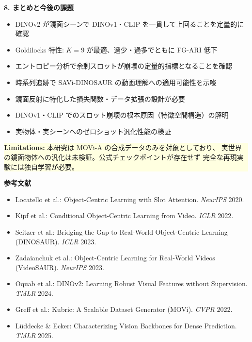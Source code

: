\documentclass[12pt]{jarticle}
\newcommand{\sechead}[1]{%
  \vspace{2mm}%
  \colorbox{secblue}{\parbox{\dimexpr\linewidth-2\fboxsep}{\color{white}\Huge\textbf{#1}}}%
  \vspace{2mm}%
}
\begin{document}
\begin{minipage}[t]{0.487\linewidth}
\sechead{8. まとめと今後の課題}
\begin{itemize}
  \item DINOv2 が鏡面シーンで DINOv1・CLIP を一貫して上回ることを定量的に確認
  \item Goldilocks 特性: $K{=}9$ が最適、過少・過多でともに FG-ARI 低下
  \item エントロピー分析で余剰スロットが崩壊の定量的指標となることを確認
  \item 時系列追跡で SAVi-DINOSAUR の動画理解への適用可能性を示唆
\end{itemize}
\vspace{2mm}
\begin{itemize}
  \item 鏡面反射に特化した損失関数・データ拡張の設計が必要
  \item DINOv1・CLIP でのスロット崩壊の根本原因（特徴空間構造）の解明
  \item 実物体・実シーンへのゼロショット汎化性能の検証
\end{itemize}
\vspace{2mm}
\colorbox{lightyellow}{\parbox{\dimexpr\linewidth-2\fboxsep}{%
  \textbf{Limitations:} 本研究は MOVi-A の合成データのみを対象としており、
  実世界の鏡面物体への汎化は未検証。公式チェックポイントが存在せず
  完全な再現実験には独自学習が必要。
}}

\end{minipage}

\vspace{4mm}
\colorbox{secblue}{\parbox{\linewidth}{\color{white}\Huge\textbf{参考文献}}}\vspace{2mm}
\fontsize{18}{24}\selectfont
\begin{minipage}[t]{0.487\linewidth}
\begin{itemize}[leftmargin=1.5em, itemsep=1pt, topsep=0pt]
  \item Locatello et al.: Object-Centric Learning with Slot Attention. \textit{NeurIPS} 2020.
  \item Kipf et al.: Conditional Object-Centric Learning from Video. \textit{ICLR} 2022.
  \item Seitzer et al.: Bridging the Gap to Real-World Object-Centric Learning (DINOSAUR). \textit{ICLR} 2023.
  \item Zadaianchuk et al.: Object-Centric Learning for Real-World Videos (VideoSAUR). \textit{NeurIPS} 2023.
\end{itemize}
\end{minipage}%
\hfill%
\begin{minipage}[t]{0.487\linewidth}
\begin{itemize}[leftmargin=1.5em, itemsep=1pt, topsep=0pt]
  \item Oquab et al.: DINOv2: Learning Robust Visual Features without Supervision. \textit{TMLR} 2024.
  \item Greff et al.: Kubric: A Scalable Dataset Generator (MOVi). \textit{CVPR} 2022.
  \item L\"{u}ddecke \& Ecker: Characterizing Vision Backbones for Dense Prediction. \textit{TMLR} 2025.
\end{itemize}
\end{minipage}
\end{document}
